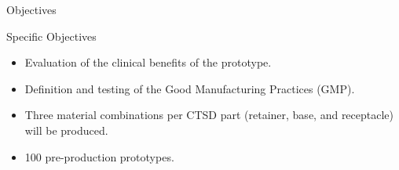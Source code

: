 \documentclass[10pt]{beamer} %
\begin{document}
\begin{frame}[fragile]{Objectives}
\begin{alertblock}{Specific Objectives}
\begin{itemize}[<+- | alert@+>]
\item Evaluation of the clinical benefits of the prototype. 
\item Definition and testing of the Good Manufacturing Practices (GMP).  
\item Three material combinations per CTSD part (retainer, base, and receptacle) will be produced. 
\item 100 pre-production prototypes.
\end{itemize}
\end{alertblock}
\end{frame}
\end{document}

